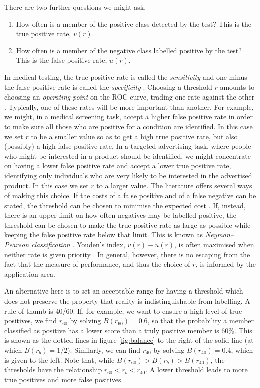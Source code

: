 \documentclass[preprint,12pt]{article}
\begin{document}
There are two further questions we might ask. 
\begin{enumerate}
\item How often is a member of the positive class detected by the test? This is the true positive rate, $v(r)$.
\item How often is a member of the negative class labelled positive by the test? This is the false positive rate, $u(r)$.
\end{enumerate}
In medical testing, the true positive rate is called the {\it sensitivity} and one minus the false positive rate is called the {\it specificity} \cite{altman1994diagnostic}. Choosing a threshold $r$ amounts to choosing an {\it operating point} on the ROC curve, trading one rate against the other \cite{fawcett2006introduction}.
Typically, one of these rates will be more important than another. For example, we might, in a medical screening task, accept a higher false positive rate in order to make sure all those who are positive for a condition are identified. In this case we set $r$ to be a smaller value so as to get a high true positive rate, but also (possibly) a high false positive rate.  In a targeted advertising task, where people who might be interested in a product should be identified, we might concentrate on having a lower false positive rate and accept a lower true positive rate, identifying only individuals who are very likely to be interested in the advertised product. In this case we set $r$ to a larger value. The literature offers several ways of making this choice. If the costs of a false positive and of a false negative can be stated, the threshold can be chosen to minimise the expected cost \cite{elkan2001foundations}. If, instead, there is an upper limit on how often negatives may be labelled positive, the threshold can be chosen to make the true positive rate as large as possible while keeping the false positive rate below that limit. This is known as {\it Neyman--Pearson classification} \cite{neyman1933ix, scott2005neyman, tong2018neyman}. Youden's index, $v(r)-u(r)$, is often maximised when neither rate is given priority \cite{youden1950index}. In general, however, there is no escaping from the fact that the measure of performance, and thus the choice of $r$, is informed by the application area.

An alternative here is to set an acceptable range for having a threshold which does not preserve the property that reality is indistinguishable from labelling. A rule of thumb is 40/60. If, for example, we want to ensure a high level of true positives, we find $r_{60}$ by solving $B(r_{60})=0.6$, so that the probability a member classified as positive has a lower score than a truly positive member is 60\%. This is shown as the dotted lines in figure \ref{fig:balance} to the right of the solid line (at which $B(r_{b})=1/2$). Similarly, we can find $r_{40}$ by solving $B(r_{40})=0.4$, which is given to the left. Note that, while $B(r_{60})>B(r_b)>B(r_{40})$, the thresholds have the relationship $r_{60}<r_b<r_{40}$. A lower threshold leads to more true positives and more false positives. 
\end{document}
